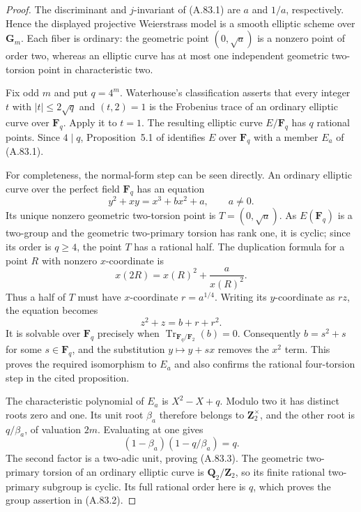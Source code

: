 \documentclass[11pt]{article}
\begin{document}
\begin{proof}
The discriminant and $j$-invariant of (A.83.1) are $a$ and $1/a$,
respectively. Hence the displayed projective Weierstrass model is
a smooth elliptic scheme over $\mathbf G_m$. Each fiber is ordinary:
the geometric point $(0,\sqrt a)$ is a nonzero point of order two,
whereas an elliptic curve has at most one independent geometric
two-torsion point in characteristic two.

Fix odd $m$ and put $q=4^m$. Waterhouse's classification
\citep[Theorem~4.1, case~(1), p.~536]{AG_Waterhouse1969}
asserts that every integer $t$ with $|t|\le2\sqrt q$ and
$(t,2)=1$ is the Frobenius trace of an ordinary elliptic curve
over $\mathbf F_q$. Apply it to $t=1$. The resulting elliptic
curve $E/\mathbf F_q$ has $q$ rational points.
Since $4\mid q$, Proposition~5.1 of
\citep[p.~311]{AG_AuerTop2002} identifies $E$ over $\mathbf F_q$
with a member $E_a$ of (A.83.1).

For completeness, the normal-form step can be seen directly.
An ordinary elliptic curve over the perfect field $\mathbf F_q$
has an equation
\[
               y^2+xy=x^3+b x^2+a,\qquad a\ne0.
\]
Its unique nonzero geometric two-torsion point is
$T=(0,\sqrt a)$. As $E(\mathbf F_q)$ is a two-group and
the geometric two-primary torsion has rank one, it is cyclic;
since its order is $q\ge4$, the point $T$ has a rational half.
The duplication formula for a point $R$ with nonzero
$x$-coordinate is
\[
                 x(2R)=x(R)^2+\frac a{x(R)^2}.
\]
Thus a half of $T$ must have $x$-coordinate $r=a^{1/4}$.
Writing its $y$-coordinate as $rz$, the equation becomes
\[
                       z^2+z=b+r+r^2.
\]
It is solvable over $\mathbf F_q$ precisely when
$\operatorname{Tr}_{\mathbf F_q/\mathbf F_2}(b)=0$.
Consequently $b=s^2+s$ for some $s\in\mathbf F_q$, and
the substitution $y\mapsto y+sx$ removes the $x^2$ term.
This proves the required isomorphism to $E_a$ and also confirms
the rational four-torsion step in the cited proposition.

The characteristic polynomial of $E_a$ is $X^2-X+q$.
Modulo two it has distinct roots zero and one. Its unit root
$\beta_a$ therefore belongs to $\mathbf Z_2^\times$, and the
other root is $q/\beta_a$, of valuation $2m$. Evaluating at one
gives
\[
              (1-\beta_a)(1-q/\beta_a)=q.
\]
The second factor is a two-adic unit, proving (A.83.3).
The geometric two-primary torsion of an ordinary elliptic curve
is $\mathbf Q_2/\mathbf Z_2$, so its finite rational two-primary
subgroup is cyclic. Its full rational order here is $q$, which
proves the group assertion in (A.83.2).


\end{proof}
\end{document}
